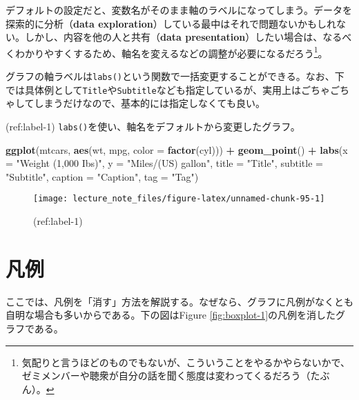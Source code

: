 \documentclass[]{book}
\newenvironment{Shaded}{\begin{snugshade}}{\end{snugshade}}
\newcommand{\KeywordTok}[1]{\textcolor[rgb]{0.13,0.29,0.53}{\textbf{#1}}}
\newcommand{\DataTypeTok}[1]{\textcolor[rgb]{0.13,0.29,0.53}{#1}}
\newcommand{\StringTok}[1]{\textcolor[rgb]{0.31,0.60,0.02}{#1}}
\newcommand{\OperatorTok}[1]{\textcolor[rgb]{0.81,0.36,0.00}{\textbf{#1}}}
\newcommand{\NormalTok}[1]{#1}
\let\rmarkdownfootnote\footnote%
\def\footnote{\protect\rmarkdownfootnote}
\begin{document}
デフォルトの設定だと、変数名がそのまま軸のラベルになってしまう。データを探索的に分析（\textbf{data
exploration}）している最中はそれで問題ないかもしれない。しかし、内容を他の人と共有（\textbf{data
presentation}）したい場合は、なるべくわかりやすくするため、軸名を変えるなどの調整が必要になるだろう\footnote{気配りと言うほどのものでもないが、こういうことをやるかやらないかで、ゼミメンバーや聴衆が自分の話を聞く態度は変わってくるだろう（たぶん）。}。

グラフの軸ラベルは\texttt{labs()}という関数で一括変更することができる。なお、下では具体例として\texttt{Title}や\texttt{Subtitle}なども指定しているが、実用上はごちゃごちゃしてしまうだけなので、基本的には指定しなくても良い。

(ref:label-1)
\texttt{labs()}を使い、軸名をデフォルトから変更したグラフ。

\begin{Shaded}
\begin{Highlighting}[]
\KeywordTok{ggplot}\NormalTok{(mtcars, }\KeywordTok{aes}\NormalTok{(wt, mpg, }\DataTypeTok{color =} \KeywordTok{factor}\NormalTok{(cyl))) }\OperatorTok{+}
\StringTok{  }\KeywordTok{geom_point}\NormalTok{() }\OperatorTok{+}
\StringTok{  }\KeywordTok{labs}\NormalTok{(}\DataTypeTok{x =} \StringTok{"Weight (1,000 Ibs)"}\NormalTok{,}
       \DataTypeTok{y =} \StringTok{"Miles/(US) gallon"}\NormalTok{,}
       \DataTypeTok{title =} \StringTok{"Title"}\NormalTok{,}
       \DataTypeTok{subtitle =} \StringTok{"Subtitle"}\NormalTok{,}
       \DataTypeTok{caption =} \StringTok{"Caption"}\NormalTok{,}
       \DataTypeTok{tag =} \StringTok{"Tag"}\NormalTok{)}
\end{Highlighting}
\end{Shaded}

\begin{figure}

{\centering \texttt{[image: lecture\_note\_files/figure-latex/unnamed-chunk-95-1]} 

}

\caption{(ref:label-1)}\label{fig:unnamed-chunk-95}
\end{figure}

\section{凡例}

ここでは、凡例を「消す」方法を解説する。なぜなら、グラフに凡例がなくとも自明な場合も多いからである。下の図はFigure
\ref{fig:boxplot-1}の凡例を消したグラフである。
\end{document}
